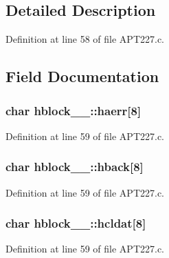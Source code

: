 \subsection{Detailed Description}


Definition at line 58 of file A\+P\+T227.\+c.



\subsection{Field Documentation}
\subsubsection[{\texorpdfstring{haerr}{haerr}}]{\setlength{\rightskip}{0pt plus 5cm}char hblock\+\_\+\_\+\+::haerr\mbox{[}8\mbox{]}}\hypertarget{structhblock__1___aa43ed56a60d89fba4ae9f711e74c5b1b}{}\label{structhblock__1___aa43ed56a60d89fba4ae9f711e74c5b1b}


Definition at line 59 of file A\+P\+T227.\+c.

\subsubsection[{\texorpdfstring{hback}{hback}}]{\setlength{\rightskip}{0pt plus 5cm}char hblock\+\_\+\_\+\+::hback\mbox{[}8\mbox{]}}\hypertarget{structhblock__1___a27822d05cc44affce49322f1068db966}{}\label{structhblock__1___a27822d05cc44affce49322f1068db966}


Definition at line 59 of file A\+P\+T227.\+c.

\subsubsection[{\texorpdfstring{hcldat}{hcldat}}]{\setlength{\rightskip}{0pt plus 5cm}char hblock\+\_\+\_\+\+::hcldat\mbox{[}8\mbox{]}}\hypertarget{structhblock__1___a01a97037d319c58a41d05e18fdb709c8}{}\label{structhblock__1___a01a97037d319c58a41d05e18fdb709c8}


Definition at line 59 of file A\+P\+T227.\+c.

